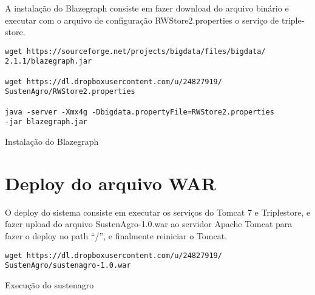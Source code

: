 A instalação do \foreignlanguage{english}{Blazegraph} consiste em
fazer download do arquivo binário e executar com o arquivo de configuração
RWStore2.properties o serviço de \foreignlanguage{english}{triplestore}.

\begin{algorithm}[h]
\begin{lstlisting}
wget https://sourceforge.net/projects/bigdata/files/bigdata/
2.1.1/blazegraph.jar

wget https://dl.dropboxusercontent.com/u/24827919/
SustenAgro/RWStore2.properties

java -server -Xmx4g -Dbigdata.propertyFile=RWStore2.properties 
-jar blazegraph.jar
\end{lstlisting}
\caption{Instalação do \foreignlanguage{english}{Blazegraph}}
\end{algorithm}

%

\section{Deploy\foreignlanguage{brazil}{ do arquivo }WAR}

%
O \foreignlanguage{english}{deploy} do sistema consiste em executar
os serviços do \foreignlanguage{english}{Tomcat} 7 e \foreignlanguage{english}{Triplestore},
e fazer \foreignlanguage{english}{upload} do arquivo SustenAgro-1.0.war
ao servidor Apache Tomcat para fazer o \foreignlanguage{english}{deploy}
no \foreignlanguage{english}{path} ``/'', e finalmente reiniciar
o \foreignlanguage{english}{Tomcat}.

\begin{algorithm}[H]
\begin{lstlisting}
wget https://dl.dropboxusercontent.com/u/24827919/
SustenAgro/sustenagro-1.0.war
\end{lstlisting}
\caption{Execução do sustenagro}
\end{algorithm}

